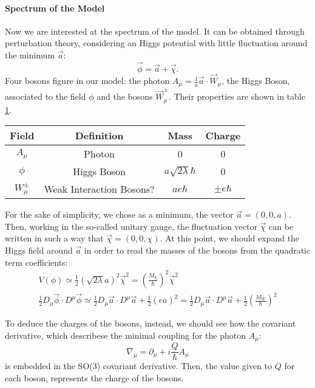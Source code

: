 \documentclass[main.tex]{subfiles}
\begin{document}
\paragraph{Spectrum of the Model}
Now we are interested at the spectrum of the model. It can be obtained through perturbation theory, considering an Higgs potential with little fluctuation around the minimum $\vec{a}$:
\begin{equation}
\vec{\phi} = \vec{a}+ \vec{\chi}. 
\end{equation} 
Four bosons figure in our model: the photon $A_{\mu} = \frac{1}{a} \vec{a}\cdot \vec{W}_\mu $, the Higgs Boson, associated to the field $\phi$ and the bosons $\vec{W}_\mu^\pm$. Their properties are shown in table \ref{tab:Bosons}.
\begin{table}[H]
\centering
\begin{tabular}{cc|cc}
\toprule
 Field  &   Definition   &  Mass  &  Charge \\
 \midrule
 $A_{\mu}$ &          Photon                   &  0                             &     0 \\
 $\phi $   &          Higgs Boson              &  $a \sqrt{2 \lambda} \hbar $   &     0 \\
$ W_{\mu}^{\pm} $&    Weak Interaction Bosons? &  $ae\hbar$                     &    $ \pm e \hbar$ \\
 \bottomrule
\end{tabular}
\label{tab:Bosons}
\end{table}


For the sake of simplicity, we chose as a minimum, the vector $\vec{a}= (0,0,a)$. Then, working in the so-called unitary gauge, the fluctuation vector $\vec{\chi}$ can be written in such a way that $\vec{\chi} = (0,0,\chi) $.
At this point, we should expand the Higgs field around $\vec{a}$ in order to read the masses of the bosons from the quadratic term coefficients:
\begin{gather}
V(\phi)\simeq  \frac{1}{2}  \left(\sqrt{2 \lambda} a\right)^2 \vec{\chi}^2 = \left( \frac{M_\chi}{\hbar }\right)^2 \vec{\chi}^2 \\
 \frac{1}{2}D_{\mu}\vec{\phi} \cdot  D^\mu \vec{\phi} \simeq  \frac{1}{2}D_{\mu}\vec{a} \cdot  D^\mu \vec{a}  + \frac{1}{2} \left( ea \right)^2 =\frac{1}{2}D_{\mu}\vec{a} \cdot  D^\mu \vec{a}  + \frac{1}{2} \left( \frac{M_W}{\hbar} \right)^2
\end{gather}

To deduce the charges of the bosons, instead, we should see how the covariant derivative, which describese the minimal coupling for the photon $A_{\mu}$: 
\begin{equation}
\nabla_\mu = \partial_\mu + i \frac{Q}{\hbar} A_{\mu}
\end{equation}
is embedded in the SO(3) covariant derivative. Then, the value given to $Q$ for each boson, represents the charge of the bosons. 
\end{document}
